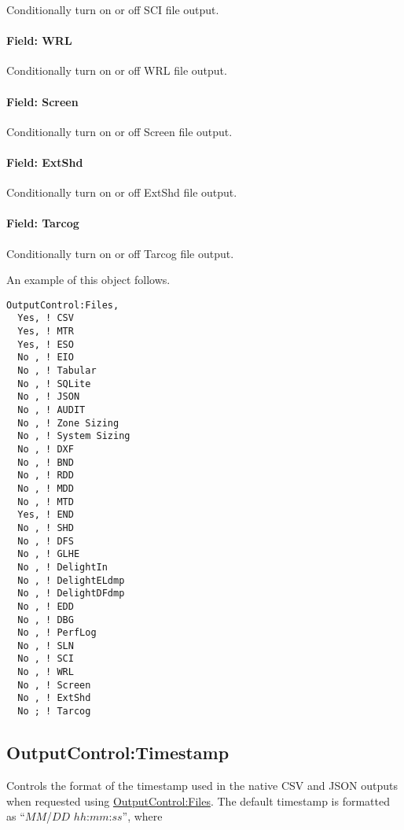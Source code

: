 Conditionally turn on or off SCI file output.

\paragraph{Field: WRL}\label{field-wrl}

Conditionally turn on or off WRL file output.

\paragraph{Field: Screen}\label{field-screen}

Conditionally turn on or off Screen file output.

\paragraph{Field: ExtShd}\label{field-ext-shd}

Conditionally turn on or off ExtShd file output.

\paragraph{Field: Tarcog}\label{field-tarcog}

Conditionally turn on or off Tarcog file output.

An example of this object follows.

\begin{lstlisting}
OutputControl:Files,
  Yes, ! CSV
  Yes, ! MTR
  Yes, ! ESO
  No , ! EIO
  No , ! Tabular
  No , ! SQLite
  No , ! JSON
  No , ! AUDIT
  No , ! Zone Sizing
  No , ! System Sizing
  No , ! DXF
  No , ! BND
  No , ! RDD
  No , ! MDD
  No , ! MTD
  Yes, ! END
  No , ! SHD
  No , ! DFS
  No , ! GLHE
  No , ! DelightIn
  No , ! DelightELdmp
  No , ! DelightDFdmp
  No , ! EDD
  No , ! DBG
  No , ! PerfLog
  No , ! SLN
  No , ! SCI
  No , ! WRL
  No , ! Screen
  No , ! ExtShd
  No ; ! Tarcog
\end{lstlisting}

\subsection{OutputControl:Timestamp}\label{outputcontrol_timestamp}

Controls the format of the timestamp used in the native CSV and JSON outputs when requested using \hyperref[outputcontrolfiles]{OutputControl:Files}. The default timestamp is formatted
as ``$MM$/$DD$ $hh$:$mm$:$ss$'', where

